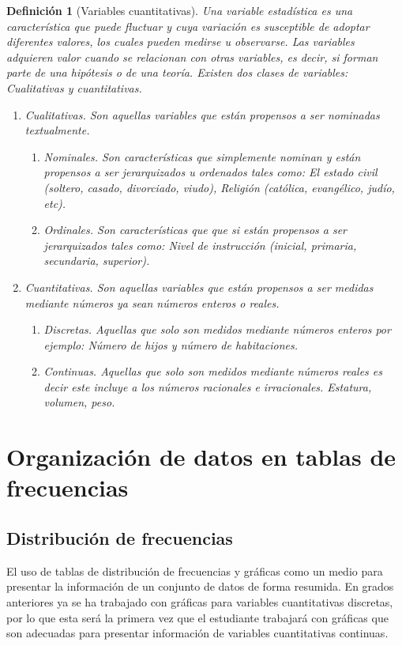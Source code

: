 \documentclass[a4paper]{report}
\newtheorem{defn}[thm]{Definición}
\begin{document}
\begin{defn}[Variables cuantitativas]
	Una variable estadística es una característica que puede fluctuar y cuya variación es susceptible de adoptar diferentes valores, los cuales pueden medirse u observarse. Las variables adquieren valor cuando se relacionan con otras variables, es decir, si forman parte de una hipótesis o de una teoría. Existen dos clases de variables: Cualitativas y cuantitativas.
	\begin{enumerate}
		\item  Cualitativas. Son aquellas variables que están propensos a ser nominadas textualmente.
		      \begin{enumerate}
			      \item  Nominales. Son características que simplemente nominan y están propensos a ser jerarquizados u ordenados tales como: El estado   civil (soltero, casado, divorciado, viudo), Religión (católica, evangélico, judío, etc).
			      \item  Ordinales. Son características que que si están propensos a ser jerarquizados tales como: Nivel de instrucción (inicial, primaria, secundaria, superior).
		      \end{enumerate}
		\item  Cuantitativas. Son aquellas variables que están propensos a ser medidas mediante números ya sean números enteros o reales.
		      \begin{enumerate}
			      \item  Discretas. Aquellas que solo son medidos mediante números enteros por ejemplo: Número de hijos y número de habitaciones.
			      \item  Continuas. Aquellas que solo son medidos mediante números reales es decir este incluye a los números racionales e irracionales. Estatura, volumen, peso.
		      \end{enumerate}
	\end{enumerate}
\end{defn}


\section{Organización de datos en tablas de frecuencias}

\subsection{Distribución de frecuencias}
El uso de tablas de distribución de frecuencias y gráficas como un medio para presentar la información
de un conjunto de datos de forma resumida. En grados anteriores ya se ha trabajado con gráficas para
variables cuantitativas discretas, por lo que esta será la primera vez que el estudiante trabajará con
gráficas que son adecuadas para presentar información de variables cuantitativas continuas.
\end{document}
